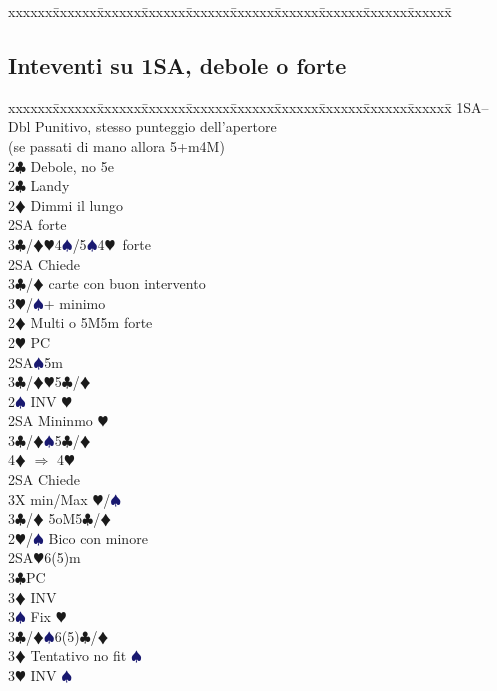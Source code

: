 \documentclass[a4paper,italian]{article}
\newcommand{\BC}{\textcolor{OliveGreen}{$\clubsuit$}}
\newcommand{\BD}{\textcolor{RedOrange}{$\vardiamondsuit$}}
\newcommand{\BH}{\textcolor{Red2}{$\varheartsuit${}}}
\newcommand{\BS}{\textcolor{MidnightBlue}{$\spadesuit${}}}
\newenvironment{bidtable}
{\begin{tabbing}

    xxxxxx\=xxxxxx\=xxxxxx\=xxxxxx\=xxxxxx\=xxxxxx\=xxxxxx\=xxxxxx\=xxxxxx\=xxxxxx\=\kill}
{\end{tabbing} }%
\begin{document}
\begin{multicols}{2}
\begin{bidtable}
    \end{bidtable}
    \vfill\null
    \columnbreak

    \subsection{Inteventi su 1SA, debole o forte}

    \begin{bidtable}
        1SA--\+\\
        Dbl \> Punitivo, stesso punteggio dell'apertore\+\\(se passati di mano allora 5+m4M)\\
        2\BC\> Debole, no 5e\-\\
        2\BC \> Landy\+\\
        2\BD\> Dimmi il lungo\+\\
        2SA forte\\
        3\BC/\BD{}\BH4\BS/5\BS4\BH\ forte\-\\
        2SA \> Chiede\+\\
        3\BC/\BD{} carte con buon intervento\\
        3\BH/\BS{}+ minimo\-\-\\
        2\BD\> Multi o 5M5m forte\+\\
        2\BH\> PC\+\\
        2SA\BS5m\\
        3\BC/\BD{}\BH5\BC/\BD\-\\
        2\BS\> INV \BH\+\\
        2SA\> Mininmo \BH\\
        3\BC/\BD{}\BS5\BC/\BD\\
        4\BD\> $\Rightarrow$ 4\BH\-\\
        2SA\> Chiede\+\\
        3X\> min/Max \BH/\BS\-\\
        3\BC/\BD\> 5oM5\BC/\BD\-\\
        2\BH/\BS\> Bico con minore\\
        2SA\BH6(5)m\+\\
        3\BC\>PC\\
        3\BD\> INV\\
        3\BS\> Fix \BH\-\\
        3\BC/\BD{}\BS6(5)\BC/\BD\+\\
        3\BD\> Tentativo no fit \BS\\
        3\BH\> INV \BS
    \end{bidtable}


\end{multicols}
\end{document}
